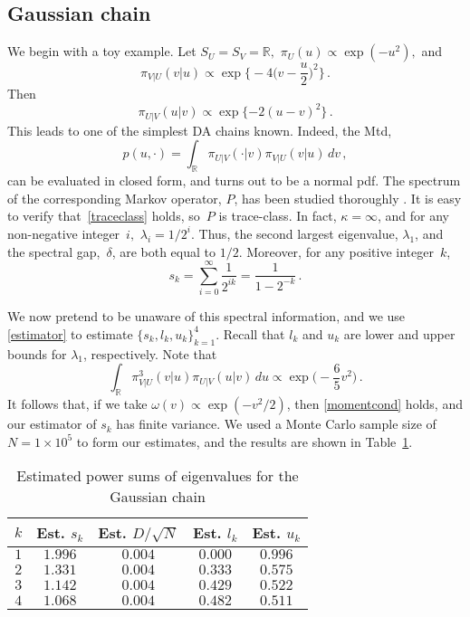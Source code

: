 \documentclass[11pt]{article}
\begin{document}
	\subsection{Gaussian chain}
	We begin with a toy example.  Let $S_U=S_V=\mathbb{R},$
        $\pi_U(u) \propto \exp(-u^2),$ and
	\[
	\pi_{V|U}(v|u) \propto \exp \Big\{ -4\Big(v-\frac{u}{2}\Big)^2
        \Big\} \,.
	\]
	Then
	\[
	\pi_{U|V} (u|v) \propto \exp \{ -2(u-v)^2 \} \,.
	\]
	This leads to one of the simplest DA chains known.  Indeed,
        the Mtd,
	\[
	p(u,\cdot) = \int_{\mathbb{R}} \pi_{U|V}(\cdot|v)
        \pi_{V|U}(v|u) \, dv \,,
	\]
	can be evaluated in closed form, and turns out to be a normal
        pdf.  The spectrum of the corresponding Markov operator, $P$,
        has been studied thoroughly \citep[see
        e.g.][]{diaconis2008gibbs}.  It is easy to verify
        that~\eqref{traceclass} holds, so~$P$ is trace-class.  In
        fact, $\kappa = \infty$, and for any non-negative integer~$i,$
        $\lambda_i = 1/2^i$.  Thus, the second largest eigenvalue,
        $\lambda_1$, and the spectral gap,~$\delta$, are both equal to
        $1/2$.  Moreover, for any positive integer~$k$,
	\[
	s_k = \sum_{i=0}^{\infty} \frac{1}{2^{ik}} =
        \frac{1}{1-2^{-k}} \,.
	\]
	
        We now pretend to be unaware of this spectral information, and
        we use \eqref{estimator} to estimate
        $\{s_k,l_k,u_k\}_{k=1}^4$.  Recall that $l_k$ and $u_k$ are
        lower and upper bounds for $\lambda_1$, respectively.  Note
        that
	\[
	\int_{\mathbb{R}} \pi^3_{V|U}(v|u) \pi_{U|V} (u|v) \, du
        \propto \exp \Big( -\frac{6}{5}v^2 \Big) \,.
	\]
        It follows that, if we take $\omega(v) \propto \exp(-v^2/2)$,
        then \eqref{momentcond} holds, and our estimator of $s_k$ has
        finite variance.  We used a Monte Carlo sample size of $N = 1
        \times 10^5$ to form our estimates, and the results are shown
        in Table~\ref{gaussian}.
        
        \begin{table}[!h]
           \begin{center} \caption{Estimated power sums of eigenvalues for the Gaussian chain} \label{gaussian}
             \medskip
			\begin{tabular}{ccccc} 
                          $k$ & Est. $s_k$ & Est. $D/\sqrt{N}$ & Est. $l_k$ & Est. $u_k$ \\ \hline
                          $1$ & $1.996$ & $0.004$ & $0.000$ & $0.996$ \\
                          $2$ & $1.331$ & $0.004$ & $0.333$ & $0.575$ \\
                          $3$ & $1.142$ & $0.004$ & $0.429$ & $0.522$ \\
                          $4$ & $1.068$ & $0.004$ & $0.482$ & $0.511$ \\
			\end{tabular}
            \end{center}
         \end{table}
\end{document}
